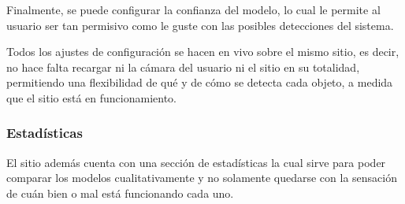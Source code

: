 \documentclass[a4paper]{article}
\begin{document}
Finalmente, se puede configurar la confianza del modelo, lo cual le permite al usuario ser tan permisivo como le guste con las posibles detecciones del sistema.

\begin{figure}[H]
\end{figure}

Todos los ajustes de configuración se hacen en vivo sobre el mismo sitio, es decir, no hace falta recargar ni la cámara del usuario ni el sitio en su totalidad, permitiendo una flexibilidad de qué y de cómo se detecta cada objeto, a medida que el sitio está en funcionamiento.

\subsubsection{Estadísticas}

El sitio además cuenta con una sección de estadísticas la cual sirve para poder comparar los modelos cualitativamente y no solamente quedarse con la sensación de cuán bien o mal está funcionando cada uno.
\end{document}
